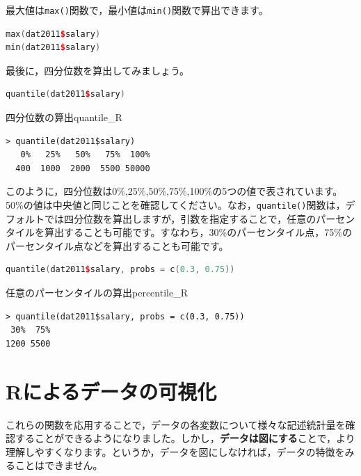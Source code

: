\documentclass{ltjsbook}
\begin{document}
最大値は\verb|max()|関数で，最小値は\verb|min()|関数で算出できます。

\begin{lstlisting}[language=c++,label={code:5_07},caption={最大値と最小値の算出}]
max(dat2011$salary)
min(dat2011$salary)
\end{lstlisting}

最後に，四分位数を算出してみましょう。

\begin{lstlisting}[language=c++,label={code:5_08},caption={四分位数の算出}]
quantile(dat2011$salary)
\end{lstlisting}

\begin{Rscreen}{四分位数の算出}{quantile_R}
\begin{verbatim}
> quantile(dat2011$salary)
   0%   25%   50%   75%  100% 
  400  1000  2000  5500 50000 
\end{verbatim}
\end{Rscreen}

このように，四分位数は0\%,25\%,50\%,75\%,100\%の5つの値で表されています。50\%の値は中央値と同じことを確認してください。なお，\verb|quantile()|関数は，デフォルトでは四分位数を算出しますが，引数を指定することで，任意のパーセンタイルを算出することも可能です。すなわち，30\%のパーセンタイル点，75\%のパーセンタイル点などを算出することも可能です。

\begin{lstlisting}[language=c++,label={code:5_09},caption={任意のパーセンタイルの算出}]
quantile(dat2011$salary, probs = c(0.3, 0.75))
\end{lstlisting}

\begin{Rscreen}{任意のパーセンタイルの算出}{percentile_R}
\begin{verbatim}
> quantile(dat2011$salary, probs = c(0.3, 0.75))
 30%  75% 
1200 5500 
\end{verbatim}
\end{Rscreen}

\section{Rによるデータの可視化}

これらの関数を応用することで，データの各変数について様々な記述統計量を確認することができるようになりました。しかし，\textbf{データは図にする}ことで，より理解しやすくなります。というか，データを図にしなければ，データの特徴をみることはできません。
\end{document}
